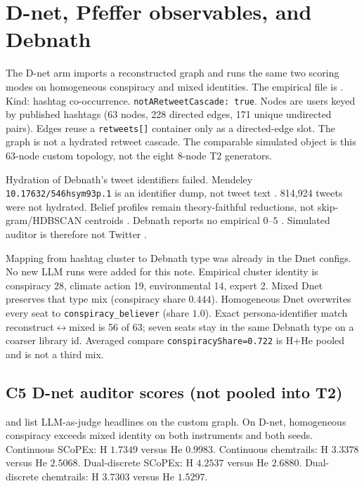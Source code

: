 \section{D-net, Pfeffer observables, and Debnath}
\label{sec:dnet}

The D-net arm imports a reconstructed graph and runs the same two scoring modes on homogeneous conspiracy and mixed identities.
The empirical file is .
Kind: hashtag co-occurrence.
\texttt{notARetweetCascade: true}.
Nodes are users keyed by published hashtags (63 nodes, 228 directed edges, 171 unique undirected pairs).
Edges reuse a \texttt{retweets[]} container only as a directed-edge slot.
The graph is not a hydrated retweet cascade.
The comparable simulated object is this 63-node custom topology, not the eight 8-node T2 generators.

Hydration of Debnath's tweet identifiers failed.
Mendeley \texttt{10.17632/546hsym93p.1} is an identifier dump, not tweet text \parencite{debnath2023dataset}.
814,924 tweets were not hydrated.
Belief profiles remain theory-faithful reductions, not skip-gram/HDBSCAN centroids \parencite{debnath2023conspiracy,geoeng2023codes}.
Debnath reports no empirical $0$--$5$ \MPR{}.
Simulated auditor \MI{} is therefore not Twitter \MI{} \parencite{ruths2014social}.

Mapping from hashtag cluster to Debnath type was already in the Dnet configs.
No new LLM runs were added for this note.
Empirical cluster identity is conspiracy 28, climate action 19, environmental 14, expert 2.
Mixed Dnet preserves that type mix (conspiracy share $0.444$).
Homogeneous Dnet overwrites every seat to \texttt{conspiracy\_believer} (share $1.0$).
Exact persona-identifier match reconstruct$\leftrightarrow$mixed is 56 of 63; seven seats stay in the same Debnath type on a coarser library id.
Averaged compare \texttt{conspiracyShare=0.722} is H+He pooled and is not a third mix.

\subsection{C5 D-net auditor scores (not pooled into T2)}

 and  list LLM-as-judge headlines on the custom graph.
On D-net, homogeneous conspiracy exceeds mixed identity on both instruments and both seeds.
Continuous SCoPEx: H $1.7349$ versus He $0.9983$.
Continuous chemtrails: H $3.3378$ versus He $2.5068$.
Dual-discrete SCoPEx: H $4.2537$ versus He $2.6880$.
Dual-discrete chemtrails: H $3.7303$ versus He $1.5297$.

